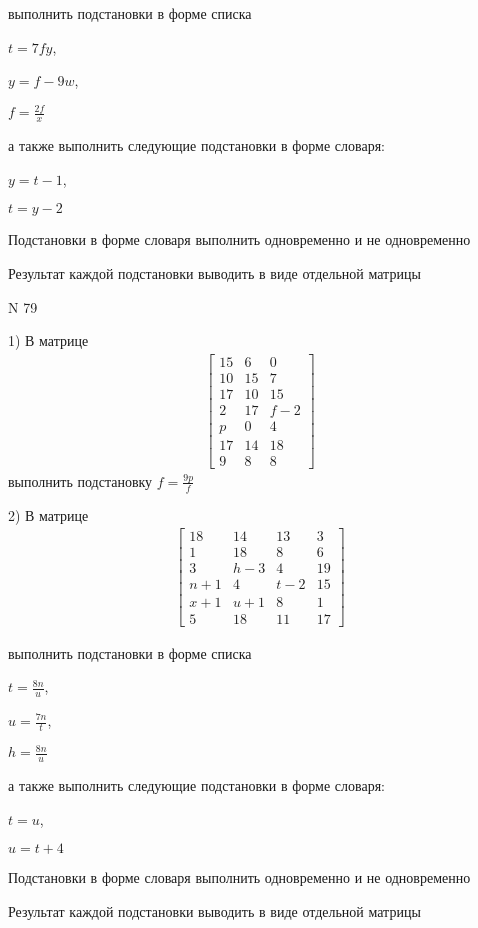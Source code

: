 \documentclass[11pt]{report}
\begin{document}
выполнить подстановки в форме списка

$t=7 f y$,

$y=f - 9 w$,

$f=\frac{2 f}{x}$

а также выполнить следующие подстановки в форме словаря:

$y=t - 1$,

$t=y - 2$


    Подстановки в форме словаря выполнить одновременно и не одновременно


    Результат каждой подстановки выводить в виде отдельной матрицы

\newpage
N 79


    1) В матрице
\begin{align*}
\left[\begin{matrix}15 & 6 & 0\\10 & 15 & 7\\17 & 10 & 15\\2 & 17 & f - 2\\p & 0 & 4\\17 & 14 & 18\\9 & 8 & 8\end{matrix}\right]
\end{align*}
выполнить подстановку $f=\frac{9 p}{f}$


    2) В матрице
\begin{align*}
\left[\begin{matrix}18 & 14 & 13 & 3\\1 & 18 & 8 & 6\\3 & h - 3 & 4 & 19\\n + 1 & 4 & t - 2 & 15\\x + 1 & u + 1 & 8 & 1\\5 & 18 & 11 & 17\end{matrix}\right]
\end{align*}

выполнить подстановки в форме списка

$t=\frac{8 n}{u}$,

$u=\frac{7 n}{t}$,

$h=\frac{8 n}{u}$

а также выполнить следующие подстановки в форме словаря:

$t=u$,

$u=t + 4$


    Подстановки в форме словаря выполнить одновременно и не одновременно


    Результат каждой подстановки выводить в виде отдельной матрицы
\end{document}
